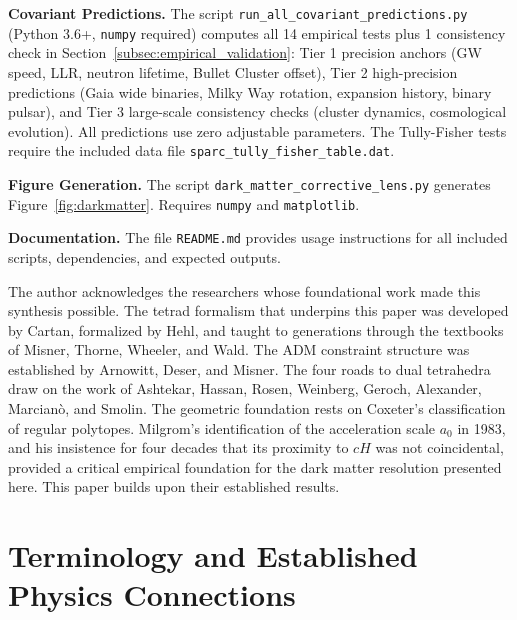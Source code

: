 \documentclass[aps,prd,preprint,superscriptaddress,showpacs,preprintnumbers,amsmath,amssymb,nofootinbib]{revtex4-2}
\begin{document}
\textbf{Covariant Predictions.}\quad
The script \texttt{run\_all\_covariant\_predictions.py} (Python 3.6+, \texttt{numpy} required) computes all 14 empirical tests plus 1 consistency check in Section~\ref{subsec:empirical_validation}: Tier 1 precision anchors (GW speed, LLR, neutron lifetime, Bullet Cluster offset), Tier 2 high-precision predictions (Gaia wide binaries, Milky Way rotation, expansion history, binary pulsar), and Tier 3 large-scale consistency checks (cluster dynamics, cosmological evolution). All predictions use zero adjustable parameters. The Tully-Fisher tests require the included data file \texttt{sparc\_tully\_fisher\_table.dat}.

\textbf{Figure Generation.}\quad
The script \texttt{dark\_matter\_corrective\_lens.py} generates Figure~\ref{fig:darkmatter}. Requires \texttt{numpy} and \texttt{matplotlib}.

\textbf{Documentation.}\quad
The file \texttt{README.md} provides usage instructions for all included scripts, dependencies, and expected outputs.

\begin{acknowledgments}
The author acknowledges the researchers whose foundational work made this synthesis possible. The tetrad formalism that underpins this paper was developed by Cartan, formalized by Hehl, and taught to generations through the textbooks of Misner, Thorne, Wheeler, and Wald. The ADM constraint structure was established by Arnowitt, Deser, and Misner. The four roads to dual tetrahedra draw on the work of Ashtekar, Hassan, Rosen, Weinberg, Geroch, Alexander, Marcian\`o, and Smolin. The geometric foundation rests on Coxeter's classification of regular polytopes. Milgrom's identification of the acceleration scale $a_0$ in 1983, and his insistence for four decades that its proximity to $cH$ was not coincidental, provided a critical empirical foundation for the dark matter resolution presented here. This paper builds upon their established results.
\end{acknowledgments}

\appendix
\section{Terminology and Established Physics Connections}
\label{app:terminology}
\end{document}
